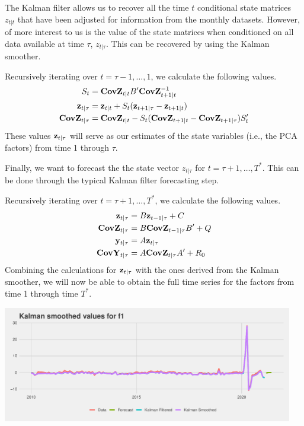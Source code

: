 \documentclass[11pt, letterpaper]{article}\usepackage[]{graphicx}\usepackage[]{color}
\newcommand{\vv}[1]{\textcolor{black}{\mathbf{#1}}}
\begin{document}
The Kalman filter allows us to recover all the time $t$ conditional state matrices $z_{t|t}$ that have been adjusted for information from the monthly datasets. However, of more interest to us is the value of the state matrices when conditioned on all data available at time $\tau$, $z_{t|\tau}$. This can be recovered by using the Kalman smoother.

Recursively iterating over $t = \tau - 1, \dots, 1$, we calculate the following values. 
\begin{align*}
	S_{t} &= \vv{CovZ}_{t|t} B' \vv{CovZ}^{-1}_{t + 1|t}\\
	\vv{z}_{t|\tau} &= \vv{z}_{t|t} + S_t (\vv{z}_{t+1|\tau} - \vv{z}_{t + 1|t})\\
	\vv{CovZ}_{t|\tau} &= \vv{CovZ}_{t|t} - S_t(\vv{CovZ}_{t + 1|t} - \vv{CovZ}_{t + 1|\tau})S'_t
\end{align*}
These values $\vv{z}_{t|\tau}$ will serve as our estimates of the state variables (i.e., the PCA factors) from time 1 through $\tau$.

Finally, we want to forecast the the state vector $z_{t|\tau}$ for $t = \tau + 1, \dots, T^*$. This can be done through the typical Kalman filter forecasting step.

Recursively iterating over $t = \tau + 1, \dots, T^*$, we calculate the following values.
\begin{align*}
	\vv{z}_{t|\tau} &= B \vv{z}_{t-1|\tau} + C\\
	\vv{CovZ}_{t|\tau} &= B \vv{CovZ}_{t-1|\tau} B'+ Q\\
	\vv{y}_{t|\tau} &= A \vv{z}_{t|\tau}\\
	\vv{CovY}_{t|\tau} &= A \vv{CovZ}_{t|\tau} A' + R_0
\end{align*}
Combining the calculations for $\vv{z}_{t|\tau}$ with the ones derived from the Kalman smoother, we will now be able to obtain the full time series for the factors from time 1 through time $T^*$.



{\centering \includegraphics[width=5in,height=2in]{figure/unnamed-chunk-11-1} 

}
\end{document}

